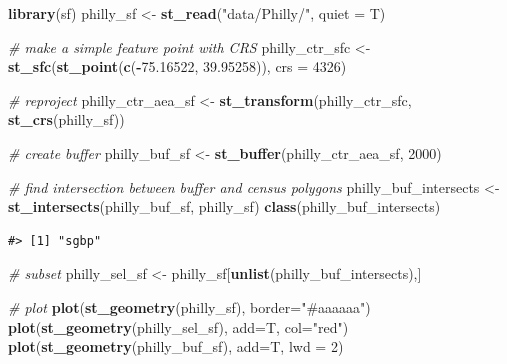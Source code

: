 \documentclass[]{book}
\newenvironment{Shaded}{\begin{snugshade}}{\end{snugshade}}
\newcommand{\KeywordTok}[1]{\textcolor[rgb]{0.13,0.29,0.53}{\textbf{#1}}}
\newcommand{\DataTypeTok}[1]{\textcolor[rgb]{0.13,0.29,0.53}{#1}}
\newcommand{\DecValTok}[1]{\textcolor[rgb]{0.00,0.00,0.81}{#1}}
\newcommand{\FloatTok}[1]{\textcolor[rgb]{0.00,0.00,0.81}{#1}}
\newcommand{\StringTok}[1]{\textcolor[rgb]{0.31,0.60,0.02}{#1}}
\newcommand{\CommentTok}[1]{\textcolor[rgb]{0.56,0.35,0.01}{\textit{#1}}}
\newcommand{\OperatorTok}[1]{\textcolor[rgb]{0.81,0.36,0.00}{\textbf{#1}}}
\newcommand{\NormalTok}[1]{#1}
\theoremstyle{definition}
\theoremstyle{definition}
\theoremstyle{definition}
\theoremstyle{remark}
\begin{document}
\begin{Shaded}
\begin{Highlighting}[]
\KeywordTok{library}\NormalTok{(sf)}
\NormalTok{philly_sf <-}\StringTok{ }\KeywordTok{st_read}\NormalTok{(}\StringTok{"data/Philly/"}\NormalTok{, }\DataTypeTok{quiet =}\NormalTok{ T)}

\CommentTok{# make a simple feature point with CRS}
\NormalTok{philly_ctr_sfc <-}\StringTok{ }\KeywordTok{st_sfc}\NormalTok{(}\KeywordTok{st_point}\NormalTok{(}\KeywordTok{c}\NormalTok{(}\OperatorTok{-}\FloatTok{75.16522}\NormalTok{, }\FloatTok{39.95258}\NormalTok{)), }\DataTypeTok{crs =} \DecValTok{4326}\NormalTok{)}

\CommentTok{# reproject}
\NormalTok{philly_ctr_aea_sf <-}\StringTok{ }\KeywordTok{st_transform}\NormalTok{(philly_ctr_sfc, }\KeywordTok{st_crs}\NormalTok{(philly_sf))}

\CommentTok{# create buffer}
\NormalTok{philly_buf_sf <-}\StringTok{ }\KeywordTok{st_buffer}\NormalTok{(philly_ctr_aea_sf, }\DecValTok{2000}\NormalTok{)}

\CommentTok{# find intersection between buffer and census polygons}
\NormalTok{philly_buf_intersects <-}\StringTok{ }\KeywordTok{st_intersects}\NormalTok{(philly_buf_sf, philly_sf)}
\KeywordTok{class}\NormalTok{(philly_buf_intersects)}
\end{Highlighting}
\end{Shaded}

\begin{verbatim}
#> [1] "sgbp"
\end{verbatim}

\begin{Shaded}
\begin{Highlighting}[]
\CommentTok{# subset}
\NormalTok{philly_sel_sf <-}\StringTok{ }\NormalTok{philly_sf[}\KeywordTok{unlist}\NormalTok{(philly_buf_intersects),]}

\CommentTok{# plot}
\KeywordTok{plot}\NormalTok{(}\KeywordTok{st_geometry}\NormalTok{(philly_sf), }\DataTypeTok{border=}\StringTok{"#aaaaaa"}\NormalTok{)}
\KeywordTok{plot}\NormalTok{(}\KeywordTok{st_geometry}\NormalTok{(philly_sel_sf), }\DataTypeTok{add=}\NormalTok{T, }\DataTypeTok{col=}\StringTok{"red"}\NormalTok{)}
\KeywordTok{plot}\NormalTok{(}\KeywordTok{st_geometry}\NormalTok{(philly_buf_sf), }\DataTypeTok{add=}\NormalTok{T, }\DataTypeTok{lwd =} \DecValTok{2}\NormalTok{)}
\end{Highlighting}
\end{Shaded}
\end{document}
